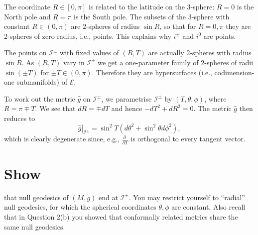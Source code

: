 \documentclass[10pt,a4paper]{exam}
\newcommand{\doit}[1]{{\color{darkgreen}\sffamily\bfseries #1}}
\newcommand{\pder}[2]{\frac{\partial #1}{\partial #2}}
\newcommand{\scri}{\mathscr{I}}
\newcommand{\esu}{\mathscr{E}}
\begin{document}
\begin{questions}
\begin{parts}
          \begin{solution}
            The coordinate $R \in [0,\pi]$ is related to the latitude
            on the $3$-sphere: $R=0$ is the North pole and $R=\pi$ is
            the South pole.  The subsets of the $3$-sphere with
            constant $R \in (0,\pi)$ are $2$-spheres of radius $\sin
            R$, so that for $R=0,\pi$ they are $2$-spheres of zero
            radius, i.e., points.  This explains why $i^\pm$ and $i^0$
            are points.

            The points on $\scri^\pm$ with fixed values of $(R,T)$ are
            actually $2$-spheres with radius $\sin R$.  As $(R,T)$
            vary in $\scri^\pm$ we get a one-parameter family of
            $2$-spheres of radii $\sin(\pm T)$ for $\pm T \in (0,\pi)$.
            Therefore they are hypersurfaces (i.e., codimension-one
            submanifolds) of $\esu$.

            To work out the metric $\hat g$ on $\scri^\pm$, we
            parametrise $\scri^\pm$ by $(T,\theta,\phi)$, where $R=\pi
            \mp T$.  We see that $dR = \mp dT$ and hence $-dT^2 + dR^2
            = 0$.  The metric $\hat g$ then reduces to
            \begin{equation*}
             \left.\hat g \right|_{\scri^\pm} = \sin^2 T (d\theta^2 + \sin^2\theta d\phi^2),
            \end{equation*}
            which is clearly degenerate since, e.g., $\pder{~}{T}$ is
            orthogonal to every tangent vector.
          \end{solution}

        \part \doit{Show} that null geodesics of $(M,g)$ end at
          $\scri^\pm$.  You may restrict yourself to ``radial'' null
          geodesics, for which the spherical coordinates $\theta,\phi$
          are constant.  Also recall that in Question 2(b) you showed
          that conformally related metrics share the same null
          geodesics.


\end{parts}
\end{questions}
\end{document}
